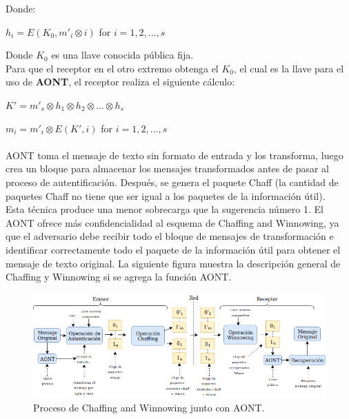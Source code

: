 \documentclass[12pt, a4paper, titlepage]{report}
\begin{document}
        Donde:
        \begin{center}
            $h_i=E(K_0,m'_i \otimes i)$ for $i=1,2,...,s$
        \end{center}
        
        Donde $K_0$ es una llave conocida pública fija.\\
        Para que el receptor en el otro extremo obtenga el $K_0$, el cual es la llave para el uso de \textbf{AONT}, el receptor realiza el siguiente cálculo:
        
        \begin{center}
            $K'=m'_s \otimes h_1 \otimes h_2 \otimes ... \otimes h_s$
        \end{center}
        \begin{center}
            $m_i=m'_i \otimes E(K',i)$ for $i=1,2,...,s$
        \end{center}
        
        \paragraph{}
        AONT toma el mensaje de texto sin formato de entrada y los transforma, luego crea un bloque para almacenar los mensajes transformados antes de pasar al proceso de autentificación. Después, se genera el paquete Chaff (la cantidad de paquetes Chaff no tiene que ser igual a los paquetes de la informaci\'on \'util).\\
        Esta técnica produce una menor sobrecarga que la sugerencia número 1. El AONT ofrece más confidencialidad al esquema de Chaffing and Winnowing, ya que el adversario debe recibir todo el bloque de mensajes de transformación e identificar correctamente todo el paquete de la informaci\'on \'util para obtener el mensaje de texto original. La siguiente figura muestra la
        descripción general de Chaffing y Winnowing si se agrega la función AONT.
        
        \begin{figure}[H]
			\begin{center}	          \includegraphics[width=14cm]{./imagenes/MarcoTeorico/chaffVsCrypto.png}
				\caption{Proceso de Chaffing and Winnowing junto con AONT.}
			\end{center}
		\end{figure}
        
\end{document}
